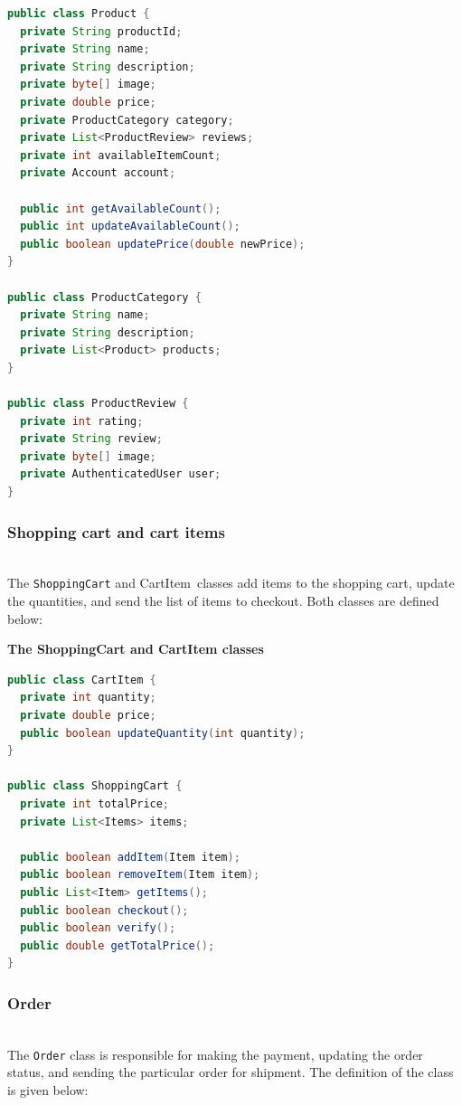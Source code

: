 \begin{lstlisting}[language=Java]
public class Product {
  private String productId;
  private String name;
  private String description;
  private byte[] image;
  private double price;
  private ProductCategory category;
  private List<ProductReview> reviews;
  private int availableItemCount;
  private Account account;

  public int getAvailableCount();
  public int updateAvailableCount();
  public boolean updatePrice(double newPrice);
}

public class ProductCategory {
  private String name;
  private String description;
  private List<Product> products;
}

public class ProductReview {
  private int rating;
  private String review;
  private byte[] image;
  private AuthenticatedUser user;
}
\end{lstlisting}

\subsubsection{Shopping cart and cart items}\label{3VyJ6YosyGRVL7Tb2VQ2W}
\\
The \texttt{ShoppingCart} and CartItem\ classes add items to the shopping cart, update the quantities, and send the list of items to checkout. Both classes are defined below:

\textbf{The ShoppingCart and CartItem classes}

\begin{lstlisting}[language=Java]
public class CartItem {
  private int quantity;
  private double price;
  public boolean updateQuantity(int quantity);
}

public class ShoppingCart {
  private int totalPrice;
  private List<Items> items;

  public boolean addItem(Item item);
  public boolean removeItem(Item item);
  public List<Item> getItems();
  public boolean checkout();
  public boolean verify();
  public double getTotalPrice();
}
\end{lstlisting}

\subsubsection{Order}\label{QVGf7_C5skQ4iD5RGmVI4}
\\
The \texttt{Order} class is responsible for making the payment, updating the order status, and sending the particular order for shipment. The definition of the class is given below:

